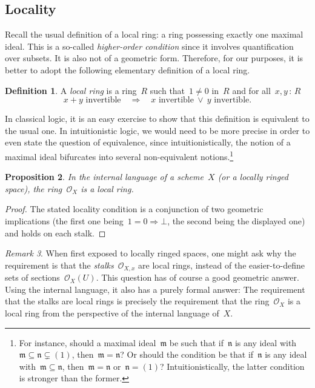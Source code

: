 \documentclass[10pt]{amsart}
\theoremstyle{definition}
\newtheorem{defn}{Definition}[section]
\theoremstyle{plain}
\newtheorem{prop}[defn]{Proposition}
\theoremstyle{remark}
\newtheorem{rem}[defn]{Remark}
\renewcommand{\O}{\mathcal{O}}
\newcommand{\mmm}{\mathfrak{m}}
\newcommand{\nnn}{\mathfrak{n}}
\newcommand{\?}{\,{:}\,}
\renewcommand{\_}{\mathpunct{.}\,}
\begin{document}
\subsection{Locality} Recall the usual definition of a local ring: a ring
possessing exactly one maximal ideal. This is a so-called \emph{higher-order
condition} since it involves quantification over subsets. It is also not of a
geometric form. Therefore, for our purposes, it is better to
adopt the following elementary definition of a local ring.
\begin{defn}A \emph{local ring} is a ring~$R$ such that~$1 \neq 0$ in~$R$ and
for all~$x,y \? R$
\[ \text{$x+y$ invertible} \quad\Longrightarrow\quad
  \text{$x$ invertible}\ \vee\ \text{$y$ invertible}. \]
\end{defn}
In classical logic, it is an easy exercise to show that this definition is
equivalent to the usual one. In intuitionistic logic, we would need to be
more precise in order to even state the question of equivalence, since
intuitionistically, the notion of a maximal ideal bifurcates into several
non-equivalent notions.\footnote{For instance, should a maximal ideal~$\mmm$ be
such that if~$\nnn$ is any ideal with~$\mmm \subseteq \nnn \subsetneq (1)$,
then~$\mmm = \nnn$? Or should the condition be that if~$\nnn$ is any ideal
with~$\mmm \subseteq \nnn$, then~$\mmm = \nnn$ or~$\nnn = (1)$?
Intuitionistically, the latter condition is stronger than the former.}

\begin{prop}\label{prop:local-ring}
In the internal language of a scheme~$X$ (or a locally ringed
space), the ring~$\O_X$ is a local ring.\end{prop}
\begin{proof}The stated locality condition is a conjunction of two geometric
implications (the first one being~$1 = 0 \Rightarrow \bot$, the second being
the displayed one) and holds on each stalk.\end{proof}

\begin{rem}When first exposed to locally ringed spaces, one might ask why the
requirement is that the \emph{stalks}~$\O_{X,x}$ are local rings, instead of the
easier-to-define sets of sections~$\O_X(U)$. This question has of course a good
geometric answer. Using the internal language, it also has a purely formal
answer: The requirement that the stalks are local rings is precisely the
requirement that the ring~$\O_X$ is a local ring from the perspective of the
internal language of~$X$.
\end{rem}
\end{document}
